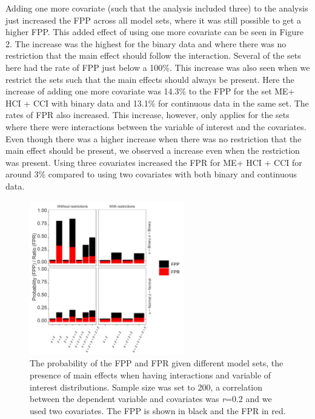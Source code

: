 Adding one more covariate (such that the analysis included three) to the analysis just increased the FPP across all model sets, where it was still possible to get a higher FPP. This added effect of using one more covariate can be seen in Figure 2. The increase was the highest for the binary data and where there was no restriction that the main effect should follow the interaction. Several of the sets here had the rate of FPP just below a 100\%. This increase was also seen when we restrict the sets such that the main effects should always be present. Here the increase of adding one more covariate was 14.3\% to the FPP for the set ME+ HCI + CCI with binary data and 13.1\% for continuous data in the same set. The rates of FPR also increased. This increase, however, only applies for the sets where there were interactions between the variable of interest and the covariates. Even though there was a higher increase when there was no restriction that the main effect should be present, we observed a increase even when the restriction was present. Using three covariates increased the FPR for ME+ HCI + CCI for around 3\% compared to using two covariates with both binary and continuous data. 

\begin{figure}[t]
\includegraphics[width=0.6\textwidth]{R/Analysis/Result/Figures/Figure1A.jpeg}
\centering
\caption{The probability of the FPP and FPR given different model sets, the presence of main effects when having interactions and variable of interest distributions. Sample size was set to 200, a correlation between the dependent variable and covariates was \textit{r}=0.2 and we used two covariates. The FPP is shown in black and the FPR in red.}
\label{fig:mainfigure}
\end{figure}

